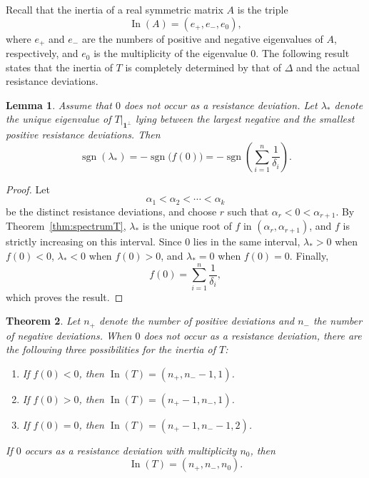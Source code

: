\documentclass[12pt,a4paper]{amsart}
\newtheorem{theorem}{Theorem}[section]
\newtheorem{lemma}[theorem]{Lemma}
\theoremstyle{remark}
\theoremstyle{definition}
\newcommand{\1}{\mathbf{1}}
\newcommand{\0}{\mathbf{0}}
\begin{document}
Recall that the inertia of a real symmetric matrix $A$ is the triple
\[
\operatorname{In}(A)=(e_+,e_-,e_0),
\]
where $e_+$ and $e_-$ are the numbers of positive and negative
eigenvalues of $A$, respectively, and $e_0$ is the multiplicity of
the eigenvalue $0$.
The following result states that the inertia of $T$ is completely determined by that of $\Delta$ and the actual resistance deviations. 

\begin{lemma}\label{sign lemma}
Assume that $0$ does not occur as a resistance deviation. Let $\lambda_*$
denote the unique eigenvalue of $\left.T\right|_{\mathbf{1}^{\perp}}$
lying between the largest negative and the smallest positive resistance
deviations. Then
\[
\operatorname{sgn}(\lambda_*)
=
-\operatorname{sgn}\bigl(f(0)\bigr)
=
-\operatorname{sgn}\left(\sum_{i=1}^{n}\frac{1}{\delta_i}\right).
\]
\end{lemma}

\begin{proof}
Let
\[
\alpha_1<\alpha_2<\cdots<\alpha_k
\]
be the distinct resistance deviations, and choose $r$ such that
$\alpha_r<0<\alpha_{r+1}$. By Theorem~\ref{thm:spectrumT},
$\lambda_*$ is the unique root of $f$ in
$(\alpha_r,\alpha_{r+1})$, and $f$ is strictly increasing on this
interval. Since $0$ lies in the same interval, $\lambda_*>0$ when
$f(0)<0$, $\lambda_*<0$ when $f(0)>0$, and $\lambda_*=0$ when
$f(0)=0$. Finally,
\[
f(0)=\sum_{i=1}^{n}\frac{1}{\delta_i},
\]
which proves the result.
\end{proof}

\begin{theorem}\label{inertia of T}
Let $n_+$ denote the number of positive deviations and $n_-$ the number
of negative deviations. When $0$ does not occur as a resistance
deviation, there are the following three possibilities for the inertia
of $T$:
\begin{enumerate}
\item If $f(0)<0$, then
$\operatorname{In}(T)=(n_+,n_--1,1)$.
\item If $f(0)>0$, then
$\operatorname{In}(T)=(n_+-1,n_-,1)$.
\item If $f(0)=0$, then
$\operatorname{In}(T)=(n_+-1,n_--1,2)$.
\end{enumerate}
If $0$ occurs as a resistance deviation with multiplicity $n_0$, then
\[
\operatorname{In}(T)=(n_+,n_-,n_0).
\]
\end{theorem}
\end{document}
